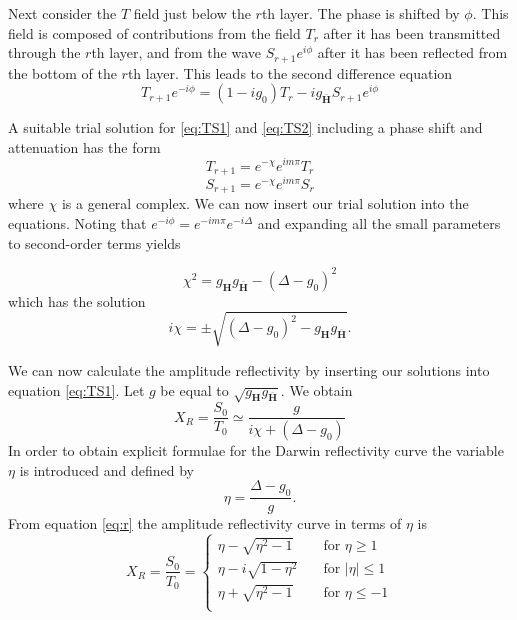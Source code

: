 \documentclass[12pt,oneside,notitlepage,abstracton,a4paper]{scrartcl}
\begin{document}
Next consider the $T$ field just below the $r$th layer. The phase is shifted by $\phi$. This field is composed of contributions from the field $T_r$ after it has been transmitted through the $r$th layer, and from the wave $S_{r+1}e^{i\phi}$ after it has been reflected from the bottom of the $r$th layer. This leads to the second difference equation
\begin{equation}\label{eq:TS2}
 T_{r+1}e^{-i\phi}=(1-ig_0)T_r-ig_\mathbf{\bar{H}}S_{r+1}e^{i\phi}
\end{equation}

A suitable trial solution for \ref{eq:TS1} and \ref{eq:TS2} including a phase shift and attenuation has the form
\begin{equation}
T_{r+1}=e^{-\chi}e^{im\pi}T_r
\end{equation}
\begin{equation}
S_{r+1}=e^{-\chi}e^{im\pi}S_r
\end{equation}
where $\chi$ is a general complex. We can now insert our trial solution into the equations. Noting that $e^{-i\phi}=e^{-im\pi}e^{-i\Delta}$ and expanding all the small parameters to second-order terms yields

\begin{equation}
\chi^2=g_\mathbf{H}g_\mathbf{\bar{H}}-(\Delta-g_0)^2
\end{equation}
which has the solution
\begin{equation}
i\chi=\pm \sqrt{(\Delta-g_0)^2-g_\mathbf{H}g_\mathbf{\bar{H}}}.
\end{equation}

We can now calculate the amplitude reflectivity by inserting our solutions into equation \ref{eq:TS1}. Let $g$ be equal to $\sqrt{g_\mathbf{H}g_\mathbf{\bar{H}}}$. We obtain
\begin{equation}\label{eq:r}
X_R=\frac{S_0}{T_0} \simeq \frac{g}{i\chi+(\Delta-g_0)}
\end{equation}
In order to obtain explicit formulae for the Darwin reflectivity curve the variable $\eta$ is introduced and defined by
\begin{equation}
\eta=\frac{\Delta-g_0}{g}.
\end{equation}
From equation \ref{eq:r} the amplitude reflectivity curve in terms of $\eta$ is
\begin{equation}\label{eq:darwin}
 X_R=\frac{S_0}{T_0}=
 \begin{cases}
  \eta-\sqrt{\eta^2-1} & \quad \text{for } \eta\ge 1  \\
  \eta-i\sqrt{1-\eta^2} & \quad \text{for } |\eta|\le 1  \\
  \eta+\sqrt{\eta^2-1} & \quad \text{for } \eta\le -1  \\
 \end{cases}
\end{equation}
\end{document}
